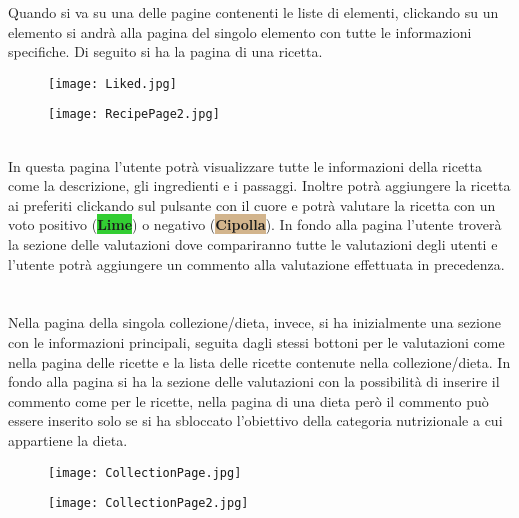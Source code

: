 ﻿\documentclass[a4paper,12pt]{report}
\begin{document}
\\\\\\\\\\Quando si va su una delle pagine contenenti le liste di elementi, clickando su un elemento si andrà alla pagina del singolo elemento con tutte le informazioni specifiche. 
Di seguito si ha la pagina di una ricetta.
\begin{figure}[h!]
    \begin{minipage}{.5\textwidth}
        \centering
        \texttt{[image: Liked.jpg]}
    \end{minipage}
    \begin{minipage}{.5\textwidth}
        \centering
        \texttt{[image: RecipePage2.jpg]}
    \end{minipage}
\end{figure}
\\In questa pagina l'utente potrà visualizzare tutte le informazioni della ricetta come la descrizione, gli ingredienti e i passaggi.
Inoltre potrà aggiungere la ricetta ai preferiti clickando sul pulsante con il cuore e potrà valutare la ricetta con un voto positivo (\colorbox{LimeGreen}{\textbf{Lime}}) o negativo (\colorbox{Tan}{\textbf{Cipolla}}).
In fondo alla pagina l'utente troverà la sezione delle valutazioni dove compariranno tutte le valutazioni degli utenti e l'utente potrà aggiungere un commento alla valutazione effettuata in precedenza.
\\\\\\Nella pagina della singola collezione/dieta, invece, si ha inizialmente una sezione con le informazioni principali, seguita dagli stessi bottoni per le valutazioni come nella pagina delle ricette e la lista delle ricette contenute nella collezione/dieta.
In fondo alla pagina si ha la sezione delle valutazioni con la possibilità di inserire il commento come per le ricette, nella pagina di una dieta però il commento può essere inserito solo se si ha sbloccato l'obiettivo della categoria nutrizionale a cui appartiene la dieta.
\begin{figure}[h!]
    \begin{minipage}{.5\textwidth}
        \centering
        \texttt{[image: CollectionPage.jpg]}
    \end{minipage}
    \begin{minipage}{.5\textwidth}
        \centering
        \texttt{[image: CollectionPage2.jpg]}
    \end{minipage}
\end{figure}
\end{document}
